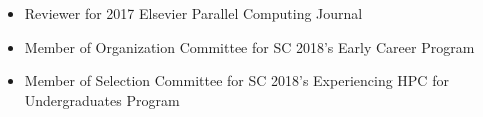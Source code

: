 \begin{itemize} 
\item Reviewer for 2017 Elsevier Parallel Computing Journal 
\item Member of Organization Committee for SC 2018's Early Career Program
\item Member of Selection Committee for SC 2018's Experiencing HPC for Undergraduates Program
\end{itemize}
